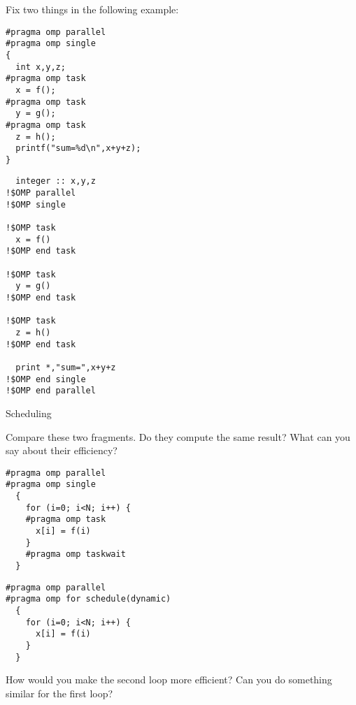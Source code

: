 Fix two things in the following example:
\begin{multicols}{2}
\small
\lstset{language=C}
\begin{lstlisting}
#pragma omp parallel
#pragma omp single
{
  int x,y,z;
#pragma omp task
  x = f();
#pragma omp task
  y = g();
#pragma omp task
  z = h();
  printf("sum=%d\n",x+y+z);
}
\end{lstlisting}
\columnbreak
\lstset{language=Fortran}
\begin{lstlisting}
  integer :: x,y,z
!$OMP parallel
!$OMP single

!$OMP task
  x = f()
!$OMP end task

!$OMP task
  y = g()
!$OMP end task

!$OMP task
  z = h()
!$OMP end task

  print *,"sum=",x+y+z
!$OMP end single
!$OMP end parallel
\end{lstlisting}
\end{multicols}


 {Scheduling}

Compare these two fragments. Do they compute the same result? What can you say about their efficiency?
\begin{multicols}{2}
\begin{lstlisting}
#pragma omp parallel
#pragma omp single
  {
    for (i=0; i<N; i++) {
    #pragma omp task
      x[i] = f(i)
    }
    #pragma omp taskwait
  }
\end{lstlisting}
\columnbreak
\begin{lstlisting}
#pragma omp parallel
#pragma omp for schedule(dynamic)
  {
    for (i=0; i<N; i++) {
      x[i] = f(i)
    }
  }
\end{lstlisting}
\end{multicols}

How would you make the second loop more efficient?
Can you do something similar for the first loop?

